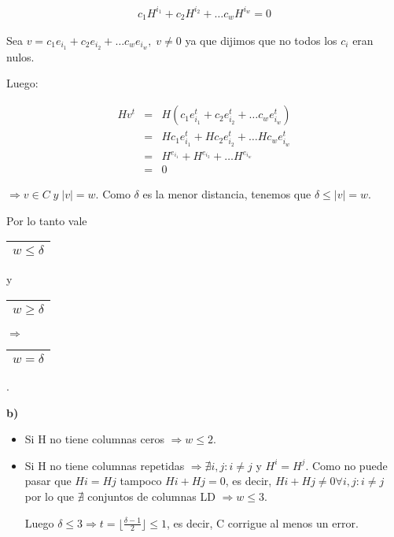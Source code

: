\documentclass[12pt,a4paper]{report}
\newcounter{neq}
\begin{document}
		\begin{eqnarray}
			\nonumber c_{1} H^{i_{1}} + c_{2} H^{i_{2}} + \dotsc c_{w} H^{i_{w}} = 0 
		\end{eqnarray}
		
		Sea $v = c_{1} e_{i_{1}} + c_{2} e_{i_{2}} + \dotsc c_{w} e_{i_{w}} , \; v \neq 0$ ya que dijimos que no todos los $c_{i}$ eran nulos.
		
		Luego:
		
		\begin{eqnarray}
			\nonumber H v^{t} &=& H (c_{1} e_{i_{1}}^{t} + c_{2} e_{i_{2}}^{t} + \dotsc c_{w} e_{i_{w}}^{t}) \\
			\nonumber &=& H c_{1} e_{i_{1}}^{t} + H c_{2} e_{i_{2}}^{t} + \dotsc H c_{w} e_{i_{w}}^{t} \\
			\nonumber &=& H^{e_{i_{1}}} + H^{e_{i_{2}}} + \dotsc H^{e_{i_{w}}} \\
			\nonumber &=& 0
		\end{eqnarray}
		
		$\Rightarrow v \in C \; y \; \lvert v \rvert = w$. Como $\delta$ es la menor distancia, tenemos que $\delta \leq \lvert v \rvert = w$. 
		
		\vspace{5mm}		
		Por lo tanto vale \begin{tabular}{|c|} \hline $w \leq \delta $ \\ \hline \end{tabular} y \begin{tabular}{|c|} \hline $w \geq \delta $ \\ \hline \end{tabular} $\Rightarrow$ \begin{tabular}{|c|} \hline $w = \delta $ \\ \hline \end{tabular}.
		
		\vspace{5mm}
		\textbf{b)}
		\begin{itemize}
			\item Si H no tiene columnas ceros $\Rightarrow w \leq 2$.
			\item Si H no tiene columnas repetidas $\Rightarrow \nexists i,j : i \neq j$ y $H^{i} = H^{j}$. Como no puede pasar que $H{i} = H{j}$ tampoco $H{i} + H{j} = 0$, es decir, $H{i} + H{j} \neq 0 \forall i,j : i \neq j$ por lo que $\nexists$ conjuntos de columnas LD $\Rightarrow w \leq 3$.
			
			Luego $\delta \leq 3 \Rightarrow t = \lfloor \frac{\delta-1}{2} \rfloor \leq 1$, es decir, C corrigue al menos un error.
		\end{itemize}
	
\end{document}

